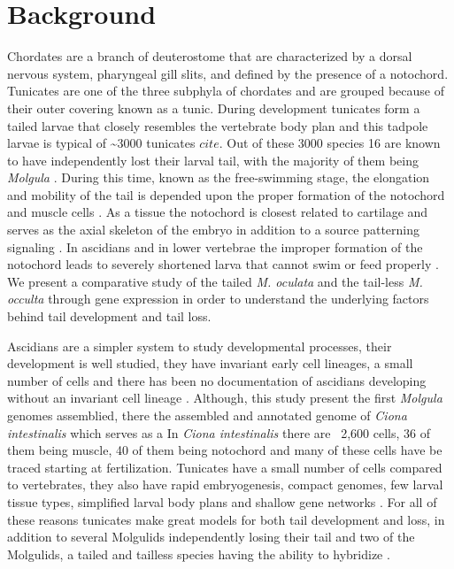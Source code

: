 \chapter{Background}
Chordates are a branch of deuterostome that are characterized by a dorsal nervous system, pharyngeal gill slits, and defined by the presence of a notochord. Tunicates are one of the three subphyla of chordates and are grouped because of their outer covering known as a tunic. During development tunicates form a tailed larvae that closely resembles the vertebrate body plan \cite{jeffery_minireview_2002} and this tadpole larvae is typical of \textasciitilde 3000 tunicates \(cite\). Out of these 3000 species 16 are known to have independently lost their larval tail, with the majority of them being \textit{Molgula} \cite{berrill_studies_1931,swalla_interspecific_1990}. During this time, known as the free-swimming stage, the elongation and mobility of the tail is depended upon the proper formation of the notochord and muscle cells \cite{satoh_ascidian_2003}. As a tissue the notochord is closest related to cartilage and serves as the axial skeleton of the embryo in addition to a source patterning signaling \cite{jeffery_evolution_1999}. In ascidians and in lower vertebrae the improper formation of the notochord leads to severely shortened larva that cannot swim or feed properly \cite{di_gregorio_tail_2002,jiang_ascidian_2005,stemple_structure_2005}. We present a comparative study of the tailed \textit{M. oculata} and the tail-less \textit{M. occulta} through gene expression in order to understand the underlying factors behind tail development and tail loss.

Ascidians are a simpler system to study developmental processes, their development is well studied, they have invariant early cell lineages, a small number of cells \cite{lemaire_evolutionary_2011} and there has been no documentation of ascidians developing without an invariant cell lineage \cite{lemaire_ascidians_2008}. Although, this study present the first \textit{Molgula} genomes assemblied, there the assembled and annotated genome of \textit{Ciona intestinalis} which serves as a  In \textit{Ciona intestinalis} there are ~2,600 cells, 36 of them being muscle, 40 of them being notochord and many of these cells have be traced starting at fertilization. Tunicates have a small number of cells compared to vertebrates, they also have rapid embryogenesis, compact genomes, few larval tissue types, simplified larval body plans and shallow gene networks \cite{corbo_characterization_1997,jeffery_minireview_2002,dehal_draft_2002}. For all of these reasons tunicates make great models for both tail development and loss, in addition to several Molgulids independently losing their tail and two of the Molgulids, a tailed and tailless species having the ability to hybridize \cite{jeffery_evolutionary_1991}. 


